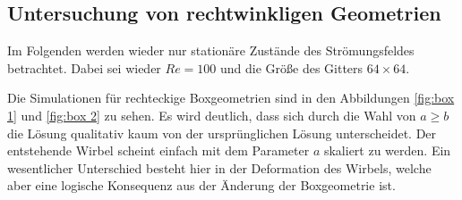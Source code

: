 

	\subsection{Untersuchung von rechtwinkligen Geometrien} %
	\label{sub:untersuchung_von_rechtwinkligen_geometrien}
	
		Im Folgenden werden wieder nur stationäre Zustände des Strömungsfeldes betrachtet.
		Dabei sei wieder $Re=100$ und die Größe des Gitters $64\times 64$.

		Die Simulationen für rechteckige Boxgeometrien sind in den Abbildungen \ref{fig:box 1} und \ref{fig:box 2} zu sehen.
		Es wird deutlich, dass sich durch die Wahl von $a\geq b$ die Lösung qualitativ kaum von der ursprünglichen Lösung unterscheidet.
		Der entstehende Wirbel scheint einfach mit dem Parameter $a$ skaliert zu werden.
		Ein wesentlicher Unterschied besteht hier in der Deformation des Wirbels, welche aber eine logische Konsequenz aus der Änderung der Boxgeometrie ist.


